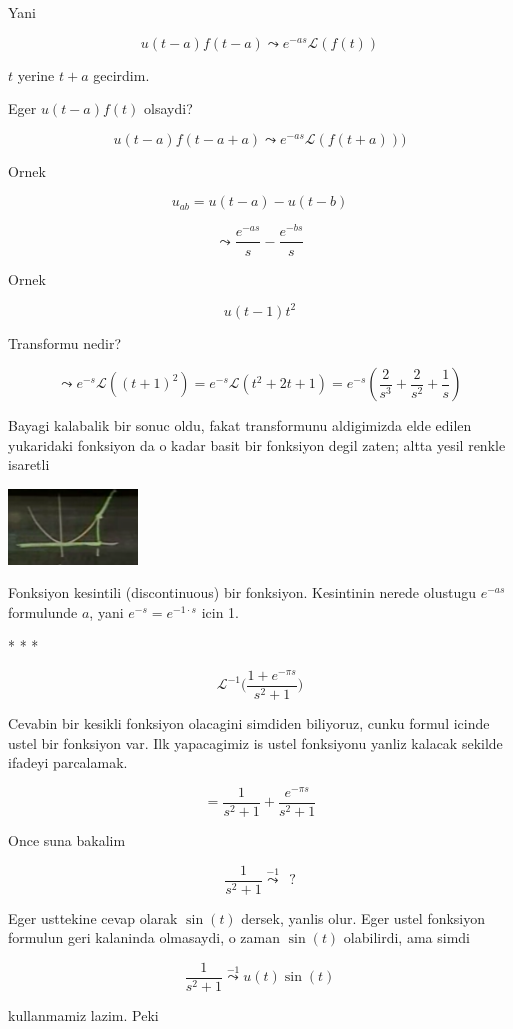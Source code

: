 \documentclass[12pt,fleqn]{article}\usepackage{../common}
\begin{document}
Yani

\[ u(t-a)f(t-a) \leadsto e^{-as}\mathcal{L}(f(t)) \]

$t$ yerine $t+a$ gecirdim.

Eger $u(t-a)f(t)$ olsaydi?

\[ u(t-a)f(t-a+a) \leadsto e^{-as}\mathcal{L}(f(t+a))) \]

Ornek 

\[ u_{ab} = u(t-a) - u(t-b) \]

\[ \leadsto \frac{e^{-as}}{s} - \frac{e^{-bs}}{s} \]

Ornek

\[ u(t-1)t^2 \]

Transformu nedir? 

\[ \leadsto e^{-s}\mathcal{L}((t+1)^2) = 
e^{-s}\mathcal{L} (t^2+2t+1) =
e^{-s}(\frac{2}{s^3} + \frac{2}{s^2} + \frac{1}{s})
 \]

Bayagi kalabalik bir sonuc oldu, fakat transformunu aldigimizda elde edilen
yukaridaki fonksiyon da o kadar basit bir fonksiyon degil zaten; altta
yesil renkle isaretli 

\includegraphics[height=2cm]{22_9.png}

Fonksiyon kesintili (discontinuous) bir fonksiyon. Kesintinin nerede
olustugu $e^{-as}$ formulunde $a$, yani $e^{-s} = e^{-1\cdot s}$ icin 1. 

* * *

\[ \mathcal{L}^{-1}\bigg( \frac{1+e^{-\pi s}}{s^2+1} \bigg) \]

Cevabin bir kesikli fonksiyon olacagini simdiden biliyoruz, cunku formul
icinde ustel bir fonksiyon var. Ilk yapacagimiz is ustel fonksiyonu yanliz
kalacak sekilde ifadeyi parcalamak. 

\[ = \frac{1}{s^2+1} + \frac{e^{-\pi s}}{s^2 + 1}\]

Once suna bakalim

\[ \frac{1}{s^2+1} \stackrel{-1}{\leadsto}  \ \ ? \]

Eger usttekine cevap olarak $\sin(t)$ dersek, yanlis olur. Eger ustel
fonksiyon formulun geri kalaninda olmasaydi, o zaman $\sin(t)$ olabilirdi,
ama simdi 

\[ \frac{1}{s^2+1} \stackrel{-1}{\leadsto} u(t)\sin(t) \]

kullanmamiz lazim. Peki
\end{document}
